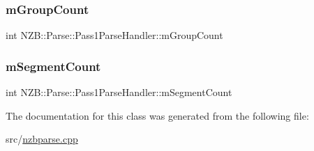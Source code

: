 \subsubsection{\texorpdfstring{m\+Group\+Count}{mGroupCount}}
{\footnotesize\ttfamily int N\+Z\+B\+::\+Parse\+::\+Pass1\+Parse\+Handler\+::m\+Group\+Count\hspace{0.3cm}{\ttfamily [protected]}}

\hypertarget{class_n_z_b_1_1_parse_1_1_pass1_parse_handler_a4160b3aae47236e9b34418de1d162152}{}\label{class_n_z_b_1_1_parse_1_1_pass1_parse_handler_a4160b3aae47236e9b34418de1d162152} 
\subsubsection{\texorpdfstring{m\+Segment\+Count}{mSegmentCount}}
{\footnotesize\ttfamily int N\+Z\+B\+::\+Parse\+::\+Pass1\+Parse\+Handler\+::m\+Segment\+Count\hspace{0.3cm}{\ttfamily [protected]}}



The documentation for this class was generated from the following file\+:\begin{DoxyCompactItemize}
\item 
src/\hyperlink{nzbparse_8cpp}{nzbparse.\+cpp}\end{DoxyCompactItemize}
